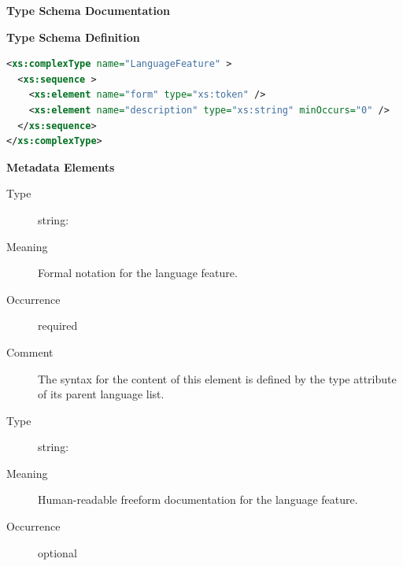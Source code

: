 \documentclass{ivoa}
\begin{document}
\begin{generated}
\begingroup
        \renewcommand*\descriptionlabel[1]{%
        \hbox to 5.5em{\emph{#1}\hfil}}\vspace{2ex}\noindent\textbf{ Type Schema Documentation}


\vspace{1ex}\noindent\textbf{ Type Schema Definition}

\begin{lstlisting}[language=XML,basicstyle=\footnotesize]
<xs:complexType name="LanguageFeature" >
  <xs:sequence >
    <xs:element name="form" type="xs:token" />
    <xs:element name="description" type="xs:string" minOccurs="0" />
  </xs:sequence>
</xs:complexType>
\end{lstlisting}

\vspace{0.5ex}\noindent\textbf{ Metadata Elements}

\begingroup\small\begin{bigdescription}\item[Element \xmlel{form}]
\begin{description}
\item[Type] string: 
\item[Meaning] Formal notation for the language feature.
\item[Occurrence] required
\item[Comment] The syntax for the content of this element is defined by the
            type attribute of its parent language list.

\end{description}
\item[Element \xmlel{description}]
\begin{description}
\item[Type] string: 
\item[Meaning] Human-readable freeform documentation for the language feature.
\item[Occurrence] optional

\end{description}


\end{bigdescription}\endgroup

\endgroup
\end{generated}
\end{document}
